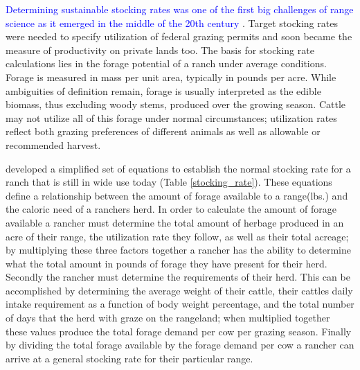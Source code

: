 \documentclass[11pt]{article}
\begin{document}
\textcolor{blue}{Determining sustainable stocking rates was one of the first big challenges of range science as it emerged in the middle of the 20th century} \citep{Bement1969, Harlan1958, Thomas2015, Paterson2012, Reppert1960, Fleischner1994}. Target stocking rates were needed to specify utilization of federal grazing permits and soon became the measure of productivity on private lands too. The basis for stocking rate calculations lies in the forage potential of a ranch under average conditions.
Forage is measured in mass per unit area, typically in pounds per acre. While ambiguities of definition remain, forage is usually interpreted as the edible biomass, thus excluding woody stems, produced over the growing season. 
Cattle may not utilize all of this forage under normal circumstances; utilization rates reflect both grazing preferences of different animals as well as allowable or recommended harvest. \citep{Holechek1999, Redfearn2000}

\citet{Holechek1988} developed a simplified set of equations to establish the normal stocking rate for a ranch that is still in wide use today (Table \ref{stocking_rate}).
These equations define a relationship between the amount of forage available to a range(lbs.) and the caloric need of a ranchers herd. In order to calculate the amount of forage available a rancher must determine the total amount of herbage produced in an acre of their range, the utilization rate they follow, as well as their total acreage; by multiplying these three factors together a rancher has the ability to determine what the total amount in pounds of forage they have present for their herd. 
Secondly the rancher must determine the requirements of their herd. This can be accomplished by determining the average weight of their cattle, their cattles daily intake requirement as a function of body weight percentage, and the total number of days that the herd with graze on the rangeland; when multiplied together these values produce the total forage demand per cow per grazing season. Finally by dividing the total forage available by the forage demand per cow a rancher can arrive at a general stocking rate for their particular range. 

\end{document}
